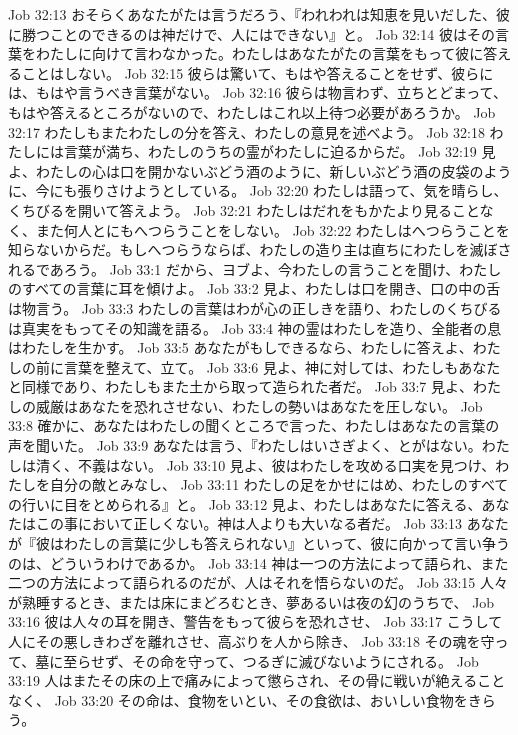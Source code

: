 Job 32:13  おそらくあなたがたは言うだろう、『われわれは知恵を見いだした、彼に勝つことのできるのは神だけで、人にはできない』と。
Job 32:14  彼はその言葉をわたしに向けて言わなかった。わたしはあなたがたの言葉をもって彼に答えることはしない。
Job 32:15  彼らは驚いて、もはや答えることをせず、彼らには、もはや言うべき言葉がない。
Job 32:16  彼らは物言わず、立ちとどまって、もはや答えるところがないので、わたしはこれ以上待つ必要があろうか。
Job 32:17  わたしもまたわたしの分を答え、わたしの意見を述べよう。
Job 32:18  わたしには言葉が満ち、わたしのうちの霊がわたしに迫るからだ。
Job 32:19  見よ、わたしの心は口を開かないぶどう酒のように、新しいぶどう酒の皮袋のように、今にも張りさけようとしている。
Job 32:20  わたしは語って、気を晴らし、くちびるを開いて答えよう。
Job 32:21  わたしはだれをもかたより見ることなく、また何人とにもへつらうことをしない。
Job 32:22  わたしはへつらうことを知らないからだ。もしへつらうならば、わたしの造り主は直ちにわたしを滅ぼされるであろう。
Job 33:1  だから、ヨブよ、今わたしの言うことを聞け、わたしのすべての言葉に耳を傾けよ。
Job 33:2  見よ、わたしは口を開き、口の中の舌は物言う。
Job 33:3  わたしの言葉はわが心の正しきを語り、わたしのくちびるは真実をもってその知識を語る。
Job 33:4  神の霊はわたしを造り、全能者の息はわたしを生かす。
Job 33:5  あなたがもしできるなら、わたしに答えよ、わたしの前に言葉を整えて、立て。
Job 33:6  見よ、神に対しては、わたしもあなたと同様であり、わたしもまた土から取って造られた者だ。
Job 33:7  見よ、わたしの威厳はあなたを恐れさせない、わたしの勢いはあなたを圧しない。
Job 33:8  確かに、あなたはわたしの聞くところで言った、わたしはあなたの言葉の声を聞いた。
Job 33:9  あなたは言う、『わたしはいさぎよく、とがはない。わたしは清く、不義はない。
Job 33:10  見よ、彼はわたしを攻める口実を見つけ、わたしを自分の敵とみなし、
Job 33:11  わたしの足をかせにはめ、わたしのすべての行いに目をとめられる』と。
Job 33:12  見よ、わたしはあなたに答える、あなたはこの事において正しくない。神は人よりも大いなる者だ。
Job 33:13  あなたが『彼はわたしの言葉に少しも答えられない』といって、彼に向かって言い争うのは、どういうわけであるか。
Job 33:14  神は一つの方法によって語られ、また二つの方法によって語られるのだが、人はそれを悟らないのだ。
Job 33:15  人々が熟睡するとき、または床にまどろむとき、夢あるいは夜の幻のうちで、
Job 33:16  彼は人々の耳を開き、警告をもって彼らを恐れさせ、
Job 33:17  こうして人にその悪しきわざを離れさせ、高ぶりを人から除き、
Job 33:18  その魂を守って、墓に至らせず、その命を守って、つるぎに滅びないようにされる。
Job 33:19  人はまたその床の上で痛みによって懲らされ、その骨に戦いが絶えることなく、
Job 33:20  その命は、食物をいとい、その食欲は、おいしい食物をきらう。
